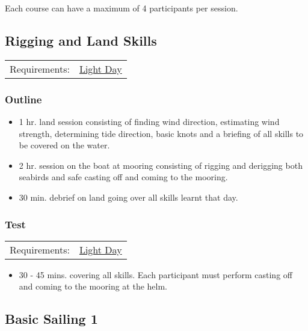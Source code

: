 \documentclass[12pt]{scrartcl}
\begin{document}
Each course can have a maximum of 4 participants per session.

\subsection{Rigging and Land Skills} \label{subsec:rigging and land skills}

\label{tab:rigging and land skills:requirements}
\begin{tabular}{ll}
	Requirements: & \hyperlink{condition:light day}{Light Day} \\
\end{tabular}

\subsubsection{Outline} \label{subsubsec:rigging and land skills:outline}

\begin{itemize}
	\item 1 hr. land session consisting of finding wind direction, estimating wind strength, determining tide direction, basic knots and a briefing of all skills to be covered on the water.
	\item 2 hr. session on the boat at mooring consisting of rigging and derigging both seabirds and safe casting off and coming to the mooring.
	\item 30 min. debrief on land going over all skills learnt that day.
\end{itemize}

\subsubsection{Test} \label{subsubsec:rigging and land skills:test}

\label{tab:rigging and land skills:test:requirements}
\begin{tabular}{ll}
	Requirements: & \hyperlink{condition:light day}{Light Day} \\
\end{tabular}

\begin{itemize}
	\item 30 - 45 mins. covering all skills. Each participant must perform casting off and coming to the mooring at the helm.
\end{itemize}

\subsection{Basic Sailing 1} \label{subsec:basic sailing 1}
\end{document}
